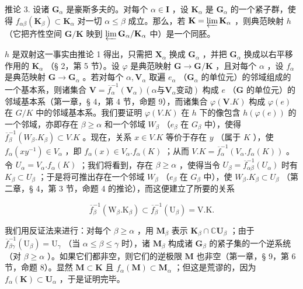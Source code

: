 推论 3. 设诸 \(\mathbf{G}_{\alpha}\) 是豪斯多夫的。对每个 \(\alpha \in \mathbf{I}\) ，设 \(\mathbf{K}_{\alpha}\) 是 \(\mathbf{G}_{\alpha}\) 的一个紧子群，使得 \(f_{\alpha \beta}(\mathbf{K}_{\beta}) \subset \mathbf{K}_{\alpha}\) 对一切 \(\alpha \leqslant \beta\) 成立。那么，若 \(\mathbf{K} = \varprojlim \mathbf{K}_{\alpha}\) ，则典范映射 \(h\) （它把齐性空间 \(\mathbf{G} / \mathbf{K}\) 映到 \(\varprojlim \mathbf{G}_{\alpha} / \mathbf{K}_{\alpha}\) 中）是一个同胚。

\(h\) 是双射这一事实由推论 1 得出，只需把 \(\mathbf{X}_{\alpha}\) 换成 \(\mathbf{G}_{\alpha}\) ，并把 \(\mathbf{G}_{\alpha}\) 换成以右平移作用的 \(\mathbf{K}_{\alpha}\) （§ 2，第 5 节）。设 \(\varphi\) 是典范映射 \(\mathbf{G} \to \mathbf{G} / \mathbf{K}\) ，且对每个 \(\alpha\) ，设 \(f_{\alpha}\) 是典范映射 \(\mathbf{G} \to \mathbf{G}_{\alpha}\) 。若对每个 \(\alpha, \mathbf{V}_{\alpha}\) 取遍 \(e_{\alpha}\) （\(\mathbf{G}_{\alpha}\) 的单位元）的邻域组成的一个基本系，则诸集合 \(\mathbf{V} = \overline{f}_{\alpha}^{-1}(\mathbf{V}_{\alpha}) (\alpha \text{与} \mathbf{V}_{\alpha} \text{变动})\) 构成 \(e\) （\(\mathbf{G}\) 的单位元）的邻域基本系（第一章，§ 4，第 4 节，命题 9），而诸集合 \(\varphi(\mathbf{V}.K)\) 构成 \(\varphi(e)\) 在 \(G/K\) 中的邻域基本系。我们要证明 \(\varphi(V.K)\) 在 \(h\) 下的像包含 \(h(\varphi(e))\) 的一个邻域，亦即存在 \(\beta \geqslant \alpha\) 和一个邻域 \(W_{\beta}\) （\(e_{\beta}\) 在 \(G_{\beta}\) 中），使得 \(\overline{f}_{\beta}^{-1}(W_{\beta}.K_{\beta}) \subset V.K\) 。现在，关系 \(x \in V.K\) 等价于存在 \(y\) （属于 \(K\) ），使 \(f_{\alpha}(xy^{-1}) \in V_{\alpha}\) ，即 \(f_{\alpha}(x) \in V_{\alpha}.f_{\alpha}(K)\) ；从而 \(V.K = \overline{f}_{\alpha}^{-1}(V_{\alpha}.f_{\alpha}(K))\) 。令 \(U_{\alpha} = V_{\alpha}.f_{\alpha}(K)\) ；我们将看到，存在 \(\beta \geqslant \alpha\) ，使得当令 \(U_{\beta} = \overline{f}_{\alpha\beta}^{-1}(U_{\alpha})\) 时有 \(K_{\beta} \subset U_{\beta}\) ；于是将可推出存在一个邻域 \(W_{\beta}\) （\(e_{\beta}\) 在 \(G_{\beta}\) 中），使 \(W_{\beta}.K_{\beta} \subset U_{\beta}\) （第二章，§ 4，第 3 节，命题 4 的推论），而这便建立了所要的关系

\[
\overline {{f}} _ {\beta} ^ {-1} (\mathrm{W} _ {\beta}. \mathrm{K} _ {\beta}) \subset \overline {{f}} _ {\beta} ^ {-1} (\mathrm{U} _ {\beta}) = \mathrm{V}. \mathrm{K}.
\]

我们用反证法来进行：对每个 \(\beta \geqslant \alpha\) ，用 \(\mathbf{M}_{\beta}\) 表示 \(\mathbf{K}_{\beta} \cap \mathbb{C}\mathbf{U}_{\beta}\) ；由于 \(\overline{f}_{\beta \gamma}^{-1}(\mathrm{U}_{\beta}) = \mathrm{U}_{\gamma}\) （当 \(\alpha \leqslant \beta \leqslant \gamma\) 时），诸 \(\mathbf{M}_{\beta}\) 构成诸 \(\mathbf{G}_{\beta}\) 的紧子集的一个逆系统（对 \(\beta \geqslant \alpha\) ）。如果它们都非空，则它们的逆极限 \(\mathbf{M}\) 也非空（第一章，§ 9，第 6 节，命题 8）。显然 \(\mathbf{M} \subset \mathbf{K}\) 且 \(f_{\alpha}(\mathbf{M}) \subset \mathbf{M}_{\alpha}\) ；但这是荒谬的，因为 \(f_{\alpha}(\mathbf{K}) \subset \mathbf{U}_{\alpha}\) ，于是证明完毕。

